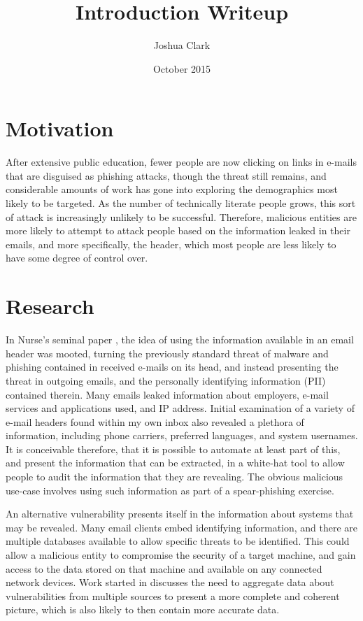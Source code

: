 \documentclass{article}
\title{Introduction Writeup}
\author{Joshua Clark}
\date{October 2015}
\begin{document}
\maketitle

\section{Motivation}
After extensive public education, fewer people are now clicking on links in e-mails that are disguised as phishing attacks, though the threat still remains, and considerable amounts of work has gone into exploring the demographics most likely to be targeted.  As the number of technically literate people grows, this sort of attack is increasingly unlikely to be successful.  Therefore, malicious entities are more likely to attempt to attack people based on the information leaked in their emails, and more specifically, the header, which most people are less likely to have some degree of control over.  
\section{Research}
In Nurse's seminal paper \cite{nurse2015investigating}, the idea of using the information available in an email header was mooted, turning the previously standard threat of malware and phishing contained in received e-mails on its head, and instead presenting the threat in outgoing emails, and the personally identifying information (PII) contained therein.  Many emails leaked information about employers, e-mail services and applications used, and IP address.  Initial examination of a variety of e-mail headers found within my own inbox also revealed a plethora of information, including phone carriers, preferred languages, and system usernames.  It is conceivable therefore, that it is possible to automate at least part of this, and present the information that can be extracted, in a white-hat tool to allow people to audit the information that they are revealing.  The obvious malicious use-case involves using such information as part of a spear-phishing exercise.

An alternative vulnerability presents itself in the information about systems that may be revealed.  Many email clients embed identifying information, and there are multiple databases available to allow specific threats to be identified.  This could allow a malicious entity to compromise the security of a target machine, and gain access to the data stored on that machine and available on any connected network devices.  Work started in \cite{joshi2013extracting} discusses the need to aggregate data about vulnerabilities from multiple sources to present a more complete and coherent picture, which is also likely to then contain more accurate data.
\end{document}
